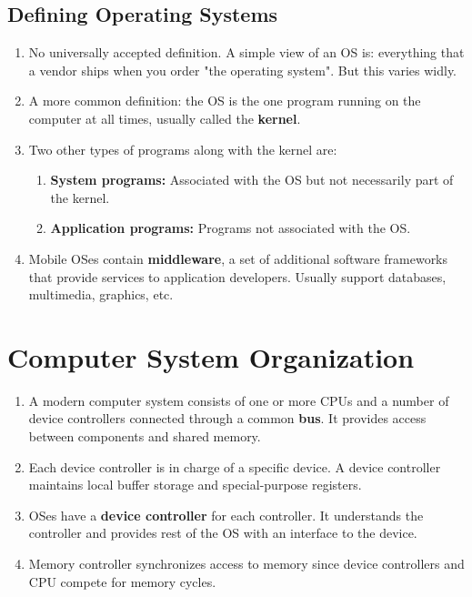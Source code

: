 \documentclass[journal,12pt,twocolumn]{IEEEtran}
\begin{document}
\subsection{Defining Operating Systems}
\begin{enumerate}
    \item No universally accepted definition. A simple view of an OS is: 
    everything that a vendor ships when you order "the operating system". But 
    this varies widly.
    \item A more common definition: the OS is the one program running on the 
    computer at all times, usually called the \textbf{kernel}.
    \item Two other types of programs along with the kernel are:
    \begin{enumerate}
        \item \textbf{System programs:} Associated with the OS but not 
        necessarily part of the kernel.
        \item \textbf{Application programs:} Programs not associated with the 
        OS.
    \end{enumerate}
    \item Mobile OSes contain \textbf{middleware}, a set of additional software 
    frameworks that provide services to application developers. Usually support 
    databases, multimedia, graphics, etc.
\end{enumerate}

\section{Computer System Organization}
\begin{enumerate}
    \item A modern computer system consists of one or more CPUs and a number of 
    device controllers connected through a common \textbf{bus}. It provides 
    access between components and shared memory.
    \item Each device controller is in charge of a specific device. A device 
    controller maintains local buffer storage and special-purpose registers.
    \item OSes have a \textbf{device controller} for each controller. It 
    understands the controller and provides rest of the OS with an interface to
    the device.
    \item Memory controller synchronizes access to memory since device
    controllers and CPU compete for memory cycles.
\end{enumerate}
\end{document}

